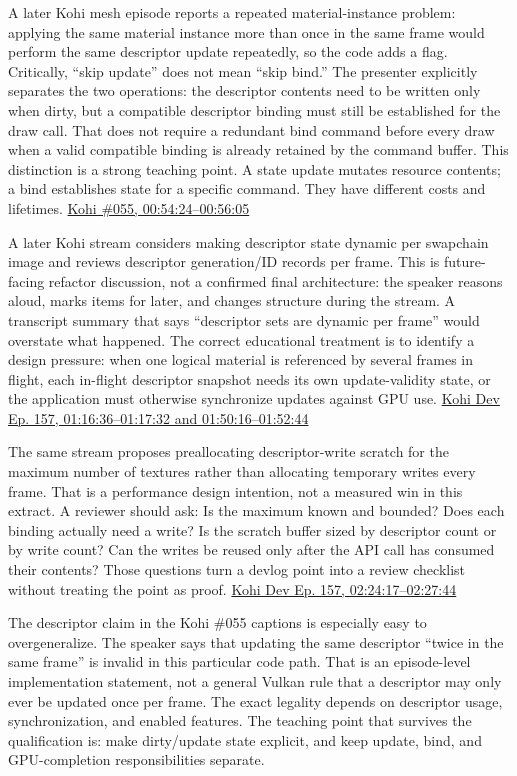 A later Kohi mesh episode reports a repeated material-instance problem: applying the same material instance more than once in the same frame would perform the same descriptor update repeatedly, so the code adds a  flag. Critically, ``skip update'' does not mean ``skip bind.'' The presenter explicitly separates the two operations: the descriptor contents need to be written only when dirty, but a compatible descriptor binding must still be established for the draw call. That does not require a redundant bind command before every draw when a valid compatible binding is already retained by the command buffer. This distinction is a strong teaching point. A state update mutates resource contents; a bind establishes state for a specific command. They have different costs and lifetimes. \href{https://www.youtube.com/watch?v=kIbW4Kv6p4c&t=54m24s}{Kohi \#055, 00:54:24--00:56:05}

A later Kohi stream considers making descriptor state dynamic per swapchain image and reviews descriptor generation/ID records per frame. This is future-facing refactor discussion, not a confirmed final architecture: the speaker reasons aloud, marks items for later, and changes structure during the stream. A transcript summary that says ``descriptor sets are dynamic per frame'' would overstate what happened. The correct educational treatment is to identify a design pressure: when one logical material is referenced by several frames in flight, each in-flight descriptor snapshot needs its own update-validity state, or the application must otherwise synchronize updates against GPU use. \href{https://www.youtube.com/watch?v=ZmZUmsqUN6Q&t=1h16m36s}{Kohi Dev Ep. 157, 01:16:36--01:17:32 and 01:50:16--01:52:44}

The same stream proposes preallocating descriptor-write scratch for the maximum number of textures rather than allocating temporary writes every frame. That is a performance design intention, not a measured win in this extract. A reviewer should ask: Is the maximum known and bounded? Does each binding actually need a write? Is the scratch buffer sized by descriptor count or by write count? Can the writes be reused only after the API call has consumed their contents? Those questions turn a devlog point into a review checklist without treating the point as proof. \href{https://www.youtube.com/watch?v=ZmZUmsqUN6Q&t=2h24m17s}{Kohi Dev Ep. 157, 02:24:17--02:27:44}

The descriptor claim in the Kohi \#055 captions is especially easy to overgeneralize. The speaker says that updating the same descriptor ``twice in the same frame'' is invalid in this particular code path. That is an episode-level implementation statement, not a general Vulkan rule that a descriptor may only ever be updated once per frame. The exact legality depends on descriptor usage, synchronization, and enabled features. The teaching point that survives the qualification is: make dirty/update state explicit, and keep update, bind, and GPU-completion responsibilities separate.

